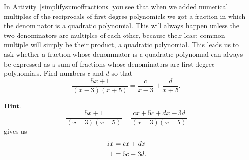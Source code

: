 \documentclass{book}
\begin{document}
\setcounter{cpjt}{264}
\addtocounter{cpjt}{-1}
\begin{activity}\label{partialfractionsintro}
\hypertarget{p-1356}{}%
In \hyperref[simplifysumoffractions]{Activity~\ref{simplifysumoffractions}} you see that when we added numerical multiples of the reciprocals of first degree polynomials we got a fraction in which the denominator is a quadratic polynomial. This will always happen unless the two denominators are multiples of each other, because their least common multiple will simply be their product, a quadratic polynomial. This leads us to ask whether a fraction whose denominator is a quadratic polynomial can always be expressed as a sum of fractions whose denominators are first degree polynomials. Find numbers \(c\) and \(d\) so that%
\begin{equation*}
\frac{5x+1}{(x-3)(x+5)} = \frac{c}{x-3} + \frac{d}{x+5}.
\end{equation*}
%
\par\smallskip%
\noindent\textbf{Hint}.\hypertarget{hint-169}{}\quad%
\hypertarget{p-1357}{}%
%
\begin{equation*}
\frac{5x+1}{(x-3)(x-5)} = \frac{cx+5c+dx-3d}{(x-3)(x-5)}
\end{equation*}
gives us%
\begin{align*}
5x & = cx+dx\\
1 &= 5c-3d\text{.}
\end{align*}
%
\par\smallskip%
\noindent\end{activity}

\clearpage
\end{document}
